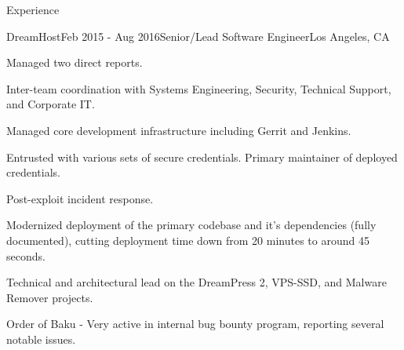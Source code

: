 \documentclass{resume} %
\begin{document}
\begin{rSection}{Experience}
\begin{rSubsection}{DreamHost}{Feb 2015 - Aug 2016}{Senior/Lead Software Engineer}{Los Angeles, CA}
\item Managed two direct reports.
\item Inter-team coordination with Systems Engineering, Security, Technical Support, and Corporate IT.
\item Managed core development infrastructure including Gerrit and Jenkins.
\item Entrusted with various sets of secure credentials. Primary maintainer of deployed credentials.
\item Post-exploit incident response.
\item Modernized deployment of the primary codebase and it's dependencies (fully documented), cutting deployment time down from 20 minutes to around 45 seconds.
\item Technical and architectural lead on the DreamPress 2, VPS-SSD, and Malware Remover projects.
\item Order of Baku - Very active in internal bug bounty program, reporting several notable issues.
\end{rSubsection}



\end{rSection}
\end{document}
